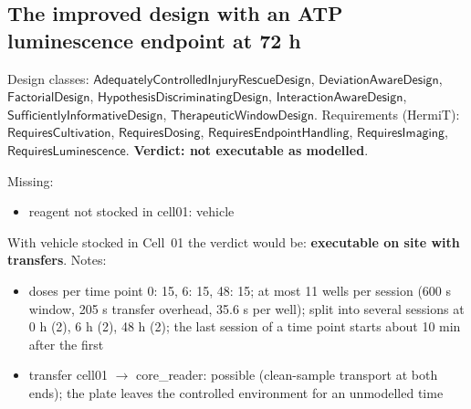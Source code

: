 \documentclass[10pt,a4paper]{article}
\begin{document}
\subsection*{The improved design with an ATP luminescence endpoint at 72 h}
Design classes: $\mathsf{AdequatelyControlledInjuryRescueDesign}$, $\mathsf{DeviationAwareDesign}$, $\mathsf{FactorialDesign}$, $\mathsf{HypothesisDiscriminatingDesign}$, $\mathsf{InteractionAwareDesign}$, $\mathsf{SufficientlyInformativeDesign}$, $\mathsf{TherapeuticWindowDesign}$. Requirements (HermiT): $\mathsf{RequiresCultivation}$, $\mathsf{RequiresDosing}$, $\mathsf{RequiresEndpointHandling}$, $\mathsf{RequiresImaging}$, $\mathsf{RequiresLuminescence}$. \textbf{Verdict: \textcolor{red!65!black}{not executable as modelled}}.
\par{}
Missing:\begin{itemize}[nosep]\item reagent not stocked in cell01: vehicle\end{itemize}
With vehicle stocked in Cell~01 the verdict would be: \textbf{executable on site with transfers}.
Notes:\begin{itemize}[nosep]\item doses per time point {0: 15, 6: 15, 48: 15}; at most 11 wells per session (600 s window, 205 s transfer overhead, 35.6 s per well); split into several sessions at 0 h (2), 6 h (2), 48 h (2); the last session of a time point starts about 10 min after the first\item transfer cell01 $\rightarrow$ core\_reader: possible (clean-sample transport at both ends); the plate leaves the controlled environment for an unmodelled time\end{itemize}
\end{document}
